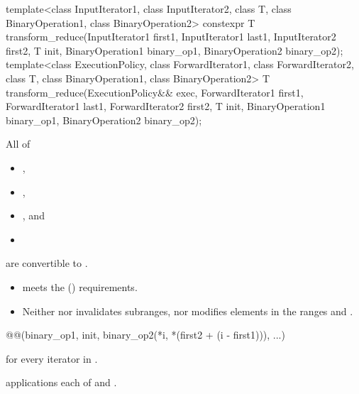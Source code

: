 %
\begin{itemdecl}
template<class InputIterator1, class InputIterator2, class T,
         class BinaryOperation1, class BinaryOperation2>
  constexpr T transform_reduce(InputIterator1 first1, InputIterator1 last1,
                               InputIterator2 first2,
                               T init,
                               BinaryOperation1 binary_op1,
                               BinaryOperation2 binary_op2);
template<class ExecutionPolicy,
         class ForwardIterator1, class ForwardIterator2, class T,
         class BinaryOperation1, class BinaryOperation2>
  T transform_reduce(ExecutionPolicy&& exec,
                     ForwardIterator1 first1, ForwardIterator1 last1,
                     ForwardIterator2 first2,
                     T init,
                     BinaryOperation1 binary_op1,
                     BinaryOperation2 binary_op2);
\end{itemdecl}

\begin{itemdescr}
\pnum
\mandates
All of
  \begin{itemize}
  \item {},
  \item {},
  \item {}, and
  \item {}
  \end{itemize}
  are convertible to .

\pnum
\expects
\begin{itemize}
\item
   meets the  () requirements.
\item
  Neither  nor 
  invalidates subranges, nor modifies elements in the ranges
   and .
\end{itemize}

\pnum
\returns
\begin{codeblock}
@@(binary_op1, init, binary_op2(*i, *(first2 + (i - first1))), ...)
\end{codeblock}
for every iterator  in .

\pnum
\complexity
{} applications each
of  and .
\end{itemdescr}

